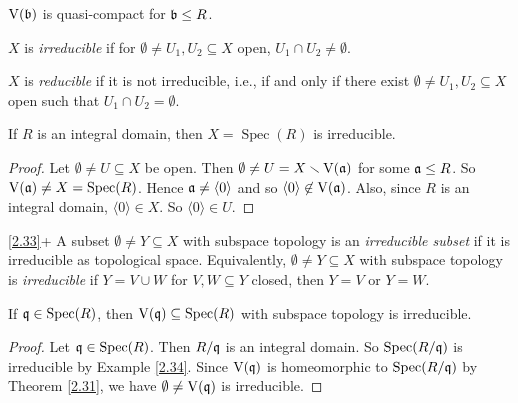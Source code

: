 \begin{corollary}\label{2.32}
    $\operatorname{V}(\mathfrak{b})$ is quasi-compact for $\mathfrak{b} \leq R$.
\end{corollary}

\begin{definition}\label{2.33}
    $X$ is \emph{irreducible} if for $\emptyset \neq U_1,U_2 \subseteq X$ open, $U_1 \cap U_2 \neq \emptyset$. \par 
    $X$ is \emph{reducible} if it is not irreducible, i.e., if and only if there exist $\emptyset \neq U_1,U_2 \subseteq X$ open such that $U_1 \cap U_2 = \emptyset$.
\end{definition}

\begin{example}\label{2.34}
    If $R$ is an integral domain, then $X = \operatorname{Spec}(R)$ is irreducible.
\end{example}

\begin{proof}
    Let $\emptyset \neq U \subseteq X$ be open. Then $\emptyset \neq U = X \smallsetminus \operatorname{V}(\mathfrak{a})$ for some $\mathfrak{a} \leq R$. So $\operatorname{V}(\mathfrak{a}) \neq X = \operatorname{Spec}(R)$. Hence $\mathfrak{a} \neq \langle 0 \rangle$ and so $\langle 0 \rangle \not \in \operatorname{V}(\mathfrak{a})$. Also, since $R$ is an integral domain, $\langle 0 \rangle \in X$. So $\langle 0 \rangle \in U$. 
\end{proof}

\begin{customdefinition}{\ref{2.33}+}
    A subset $\emptyset \neq Y \subseteq X$ with subspace topology is an \emph{irreducible subset} if it is irreducible as topological space. Equivalently, $\emptyset \neq Y \subseteq X$ with subspace topology is \emph{irreducible} if $Y = V \cup W$ for $V,W \subseteq Y$ closed, then $Y = V$ or $Y = W$.
\end{customdefinition}

\begin{corollary}\label{2.35}
    If $\mathfrak{q} \in \operatorname{Spec}(R)$, then $\operatorname{V}(\mathfrak{q}) \subseteq \operatorname{Spec}(R)$ with subspace topology is irreducible.
\end{corollary}

\begin{proof}
    Let $\mathfrak{q} \in \operatorname{Spec}(R)$. Then $R/\mathfrak{q}$ is an integral domain. So $\operatorname{Spec}(R/\mathfrak{q})$ is irreducible by Example \ref{2.34}. Since $\operatorname{V}(\mathfrak{q})$ is homeomorphic to $\operatorname{Spec}(R/\mathfrak{q})$ by Theorem \ref{2.31}, we have $\emptyset \neq \operatorname{V}(\mathfrak{q})$ is irreducible.
\end{proof}

